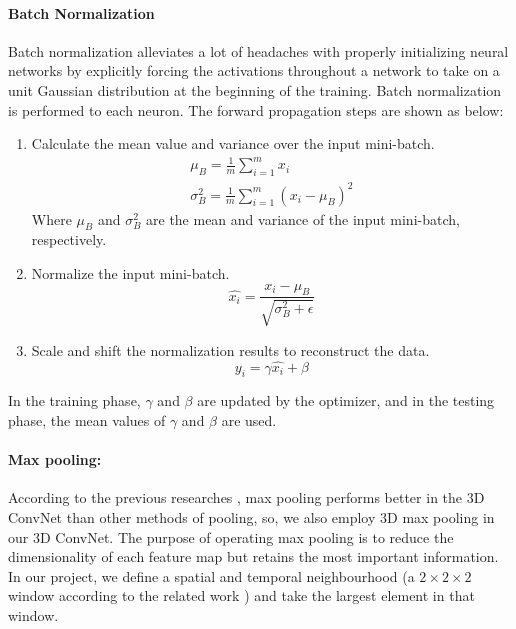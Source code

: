 \paragraph*{Batch Normalization}
\label{bn}
Batch normalization alleviates a lot of headaches with properly initializing neural networks by explicitly forcing the activations throughout a network to take on a unit Gaussian distribution at the beginning of the training. Batch normalization is performed to each neuron. The forward propagation steps are shown as below:
\begin{enumerate}
	\item Calculate the mean value and variance over the input mini-batch.
	\begin{eqnarray}
		\mu_B = \frac{1}{m} \sum_{i=1}^m x_i \\
		\sigma_B^2 = \frac{1}{m} \sum_{i=1}^m (x_i - \mu_B)^2
	\end{eqnarray}
	Where \(\mu_B\) and \(\sigma_B^2\) are the mean and variance of the input mini-batch, respectively.
	
	\item Normalize the input mini-batch.
	\begin{equation}
		\hat{x_i} = \frac{x_i - \mu_B}{\sqrt{\sigma_B^2 + \epsilon}}
	\end{equation}
	
	\item Scale and shift the normalization results to reconstruct the data.
	\begin{equation}
		y_i = \gamma \hat{x_i} + \beta
	\end{equation}
\end{enumerate}
In the training phase, \(\gamma\) and \(\beta\) are updated by the optimizer, and in the testing phase, the mean values of \(\gamma\) and \(\beta\) are used.


\paragraph*{Max pooling:}
\label{pooling}
According to the previous researches \cite{Tran2015} \cite{3dcnn_1}, max pooling performs better in the 3D ConvNet than other methods of pooling, so, we also employ 3D max pooling in our 3D ConvNet. The purpose of operating max pooling is to reduce the dimensionality of each feature map but retains the most important information. In our project, we define a spatial and temporal neighbourhood (a \(2 \times 2 \times 2\) window according to the related work \cite{Tran2015}) and take the largest element in that window. 

